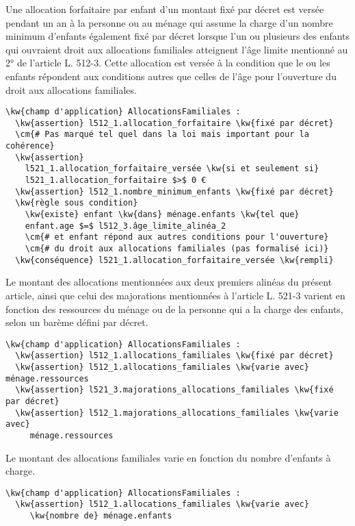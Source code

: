 \documentclass[12pt, french]{article}
\providecommand{\cm}[1]{\textit{\texttt{\textcolor{PineGreen}{#1}}}}
\newcommand{\kw}[1]{\textbf{\textcolor{OliveGreen}{#1}}}
\begin{document}
Une allocation forfaitaire par enfant d'un montant fixé par décret est versée pendant un an à la personne ou au ménage qui assume la charge d'un nombre minimum d'enfants également fixé par décret lorsque l'un ou plusieurs des enfants qui ouvraient droit aux allocations familiales atteignent l'âge limite mentionné au 2° de l'article L. 512-3. Cette allocation est versée à la condition que le ou les enfants répondent aux conditions autres que celles de l'âge pour l'ouverture du droit aux allocations familiales.
\begin{Verbatim}
\kw{champ d'application} AllocationsFamiliales :
  \kw{assertion} l512_1.allocation_forfaitaire \kw{fixé par décret}
  \cm{# Pas marqué tel quel dans la loi mais important pour la cohérence}
  \kw{assertion}
    l521_1.allocation_forfaitaire_versée \kw{si et seulement si}
    l521_1.allocation_forfaitaire $>$ 0 €
  \kw{assertion} l512_1.nombre_minimum_enfants \kw{fixé par décret}
  \kw{règle sous condition}
    \kw{existe} enfant \kw{dans} ménage.enfants \kw{tel que}
    enfant.age $=$ l512_3.âge_limite_alinéa_2
    \cm{# et enfant répond aux autres conditions pour l'ouverture}
    \cm{# du droit aux allocations familiales (pas formalisé ici)}
  \kw{conséquence} l521_1.allocation_forfaitaire_versée \kw{rempli}
\end{Verbatim}

Le montant des allocations mentionnées aux deux premiers alinéas du présent article, ainsi que celui des majorations mentionnées à l'article L. 521-3 varient en fonction des ressources du ménage ou de la personne qui a la charge des enfants, selon un barème défini par décret.
\begin{Verbatim}
\kw{champ d'application} AllocationsFamiliales :
  \kw{assertion} l512_1.allocations_familiales \kw{fixé par décret}
  \kw{assertion} l512_1.allocations_familiales \kw{varie avec} ménage.ressources
  \kw{assertion} l521_3.majorations_allocations_familiales \kw{fixé par décret}
  \kw{assertion} l512_1.majorations_allocations_familiales \kw{varie avec}
     ménage.ressources
\end{Verbatim}

Le montant des allocations familiales varie en fonction du nombre d'enfants à charge.

\begin{Verbatim}
\kw{champ d'application} AllocationsFamiliales :
  \kw{assertion} l512_1.allocations_familiales \kw{varie avec}
     \kw{nombre de} ménage.enfants
\end{Verbatim}
\end{document}

